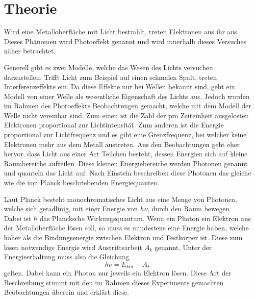 \section{Theorie}
\label{sec:Theorie}
Wird eine Metalloberfläche mit Licht bestrahlt, treten Elektronen aus ihr aus. Dieses Phänomen wird Photoeffekt genannt und wird innerhalb dieses Versuches näher betrachtet.

Generell gibt es zwei Modelle, welche das Wesen des Lichts versuchen darzustellen. Trifft Licht zum Beispiel auf einen schmalen Spalt, treten Interferenzeffekte ein. Da diese Effekte nur bei Wellen bekannt sind, geht ein Modell von einer Welle als wesentliche Eigenschaft des Lichts aus.
Jedoch wurden im Rahmen des Photoeffekts Beobachtungen gemacht, welche mit dem Modell der Welle nicht vereinbar sind. Zum einen ist die Zahl der pro Zeiteinheit ausgelösten Elektronen proportional zur Lichtintensität. Zum anderen ist die Energie proportional zur Lichtfrequenz und es gibt eine Grenzfrequenz, bei welcher keine Elektronen mehr aus dem Metall austreten. Aus den Beobachtungen geht eher hervor, dass Licht aus einer Art Teilchen besteht, dessen Energien sich auf kleine Raumbereiche aufteilen. Diese kleinen Energiebereiche werden Photonen genannt und quanteln das Licht auf. Nach Einstein beschreiben diese Photonen das gleiche wie die von Planck beschriebenden Energiequanten. 

Laut Planck besteht monochromatisches Licht aus eine Menge von Photonen, welche sich geradlinig, mit einer Energie von $h\nu$, durch den Raum bewegen. Dabei ist $h$ das Plancksche Wirkungsquantum. Wenn ein Photon ein Elektron aus der Metalloberfläche lösen soll, so muss es mindestens eine Energie haben, welche höher als die Bindungsenergie zwischen Elektron und Festkörper ist. Diese zum lösen notwendige Energie wird Austrittsarbeit $A_k$ genannt. Unter der Energieerhaltung muss also die Gleichung
\begin{equation}
    h \nu = E_{kin} + A_k
\end{equation}
gelten. Dabei kann ein Photon nur jeweils ein Elektron lösen. Diese Art der Beschreibung stimmt mit den im Rahmen dieses Experiments gemachten Beobachtungen überein und erklärt diese.




